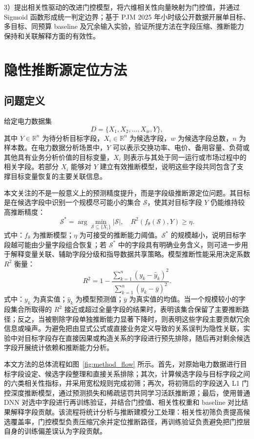 \documentclass[UTF8,zihao=5,twoside]{ctexart}
\numberwithin{equation}{section}
\begin{document}
3）提出相关性驱动的改进门控模型，将六维相关性向量映射为门控值，并通过 Sigmoid 函数形成统一判定边界；基于 PJM 2025 年小时级公开数据开展单目标、多目标、同预算 baseline 及冗余输入实验，验证所提方法在字段压缩、推断能力保持和关联解释方面的有效性。

\section{隐性推断源定位方法}
\subsection{问题定义}
给定电力数据集
\begin{equation}
D=\{X_1,X_2,\ldots,X_w,Y\},
\end{equation}
其中 $Y\in\mathbb{R}^{n}$ 为待分析目标字段，$X_i\in\mathbb{R}^{n}$ 为候选字段，$w$ 为候选字段总数，$n$ 为样本数。在电力数据分析场景中，$Y$ 可以表示交换功率、电价、备用容量、负荷或其他具有业务分析价值的目标变量，$X_i$ 则表示与其处于同一运行或市场过程中的相关字段。若部分 $X_i$ 能够对 $Y$ 建立有效推断模型，说明这些字段共同包含了支撑目标变量恢复的主要关联信息。

本文关注的不是一般意义上的预测精度提升，而是字段级推断源定位问题。其目标是在候选字段中识别一个规模尽可能小的集合 $\mathcal{S}$，使其对目标字段 $Y$ 仍能维持较高推断精度：
\begin{equation}
\mathcal{S}^{*}=\arg\min_{\mathcal{S}\subseteq \{X_i\}}\left|\mathcal{S}\right|,
\quad
R^2(f_{\theta}(\mathcal{S}),Y)\geq \eta .
\end{equation}
式中：$f_{\theta}$ 为推断模型；$\eta$ 为可接受的推断能力阈值。$\mathcal{S}^{*}$ 的规模越小，说明目标字段越可能由少量字段组合恢复；若 $\mathcal{S}^{*}$ 中的字段具有明确业务含义，则可进一步用于解释变量关联、辅助字段分级和指导数据共享策略。模型推断性能采用决定系数 $R^2$ 衡量：
\begin{equation}
R^2=1-\frac{\sum_{k=1}^{n}(y_k-\hat{y}_k)^2}{\sum_{k=1}^{n}(y_k-\bar{y})^2}.
\end{equation}
式中：$y_k$ 为真实值；$\hat{y}_k$ 为模型预测值；$\bar{y}$ 为真实值的均值。当一个规模较小的字段集合所取得的 $R^2$ 接近或超过全量字段的结果时，表明该集合保留了主要推断路径；反之，当被剔除字段单独推断能力显著下降时，则表明这些字段主要贡献冗余信息或噪声。为避免把由显式公式或直接业务定义导致的关系误判为隐性关联，实验中对目标字段存在直接因果或构造关系的字段进行预先排除，随后再对剩余候选字段开展统计依赖和推断能力分析。

本文方法的总体流程如图~\ref{fig:method_flow} 所示。首先，对原始电力数据进行目标字段设定、候选字段整理和直接关系排除；其次，计算候选字段与目标字段之间的六类相关性指标，并采用宽松规则完成初筛；再次，将初筛后的字段送入 L1 门控深度推断模型，通过预测损失和稀疏惩罚共同学习活跃推断源；最后，使用普通 DNN 对选中字段进行再训练验证，并结合门控值、相关性权重和 baseline 对比结果解释字段贡献。该流程将统计分析与推断建模分工处理：相关性初筛负责提高候选覆盖率，门控模型负责压缩冗余并定位推断路径，再训练验证负责避免把门控层自身的训练偏差误认为字段贡献。
\end{document}
